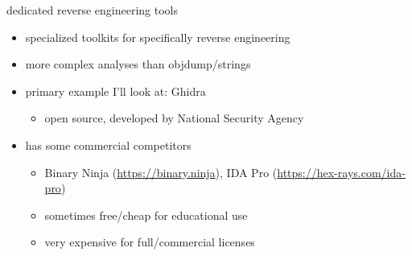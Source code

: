 \begin{frame}{dedicated reverse engineering tools}
    \begin{itemize}
    \item specialized toolkits for specifically reverse engineering
    \item more complex analyses than objdump/strings
    \vspace{.5cm}
    \item primary example I'll look at: Ghidra
        \begin{itemize}
        \item open source, developed by National Security Agency
        \end{itemize}
    \item has some commercial competitors
        \begin{itemize}
        \item Binary Ninja (\url{https://binary.ninja}), IDA Pro (\url{https://hex-rays.com/ida-pro})
        \item sometimes free/cheap for educational use
        \item very expensive for full/commercial licenses
        \end{itemize}
    \end{itemize}
\end{frame}
